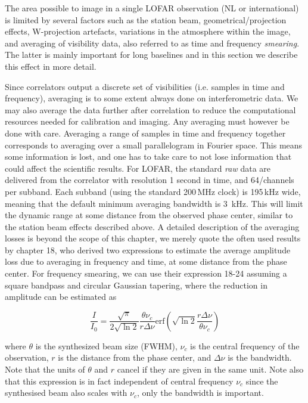 \documentclass[graybox]{svmult}
\begin{document}
The area possible to image in a single LOFAR observation (NL or international)
is limited by several factors such as the station beam, geometrical/projection
effects, W-projection artefacts, variations in the atmosphere within
the image, and averaging of visibility data, also referred to as time and
frequency \emph{smearing}. The latter is mainly important for long
baselines and in this section we describe this effect in more detail. 

Since correlators output a discrete set of visibilities (i.e. samples in time
and frequency), averaging is to some extent always done on interferometric
data. We may also average the data further after correlation to reduce the
computational resources needed for calibration and imaging. Any averaging must
however be done with care.  Averaging a range of samples in time and frequency
together corresponds to averaging over a small parallelogram in Fourier space.
This means some information is lost, and one has to take care to not lose
information that could affect the scientific results. For LOFAR, the standard
\emph{raw} data are delivered from the correlator with resolution 1 second in
time, and 64/channels per subband.  Each subband (using the standard 200\,MHz
clock) is 195\,kHz wide, meaning that the default minimum averaging bandwidth is
3~kHz. This will limit the dynamic range at some distance from the observed
phase center, similar to the station beam effects described above.  A detailed
description of the averaging losses is beyond the scope of this chapter, we
merely quote the often used results by \cite{taylor99} 
chapter 18, who derived two expressions to estimate the average amplitude loss
due to averaging in frequency and time, at some distance from the phase center.
For frequency smearing, we can use their expression 18-24 assuming a square
bandpass and circular Gaussian tapering, where the reduction in amplitude can
be estimated as

\begin{equation}
\frac{I}{I_0} = \frac{\sqrt{\pi}}{2\sqrt{\ln{2}}}\frac{\theta \nu_c}{r \Delta
\nu}\mathrm{erf}\left(\sqrt{\ln{2}}\frac{r \Delta\nu}{\theta \nu_c}\right)
\label{eqn:freqloss}
\end{equation}

where $\theta$ is the synthesized beam size (FWHM), $\nu_c$ is the central
frequency of the observation, $r$ is the distance from the phase center, and
$\Delta \nu$ is the bandwidth. Note that the units of $\theta$ and $r$ cancel
if they are given in the same unit. Note also that this expression is in fact
independent of central frequency $\nu_c$ since the synthesised beam also scales
with $\nu_c$, only the bandwidth is important.
\end{document}
